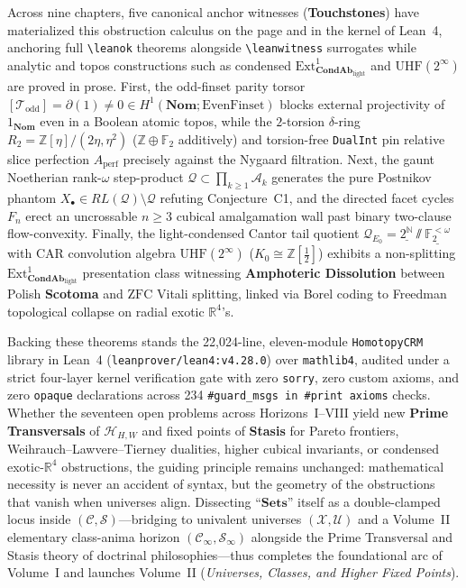 Across nine chapters, five canonical anchor witnesses (\textbf{Touchstones}) have materialized this obstruction calculus on the page and in the kernel of Lean~4, anchoring full \texttt{\textbackslash leanok} theorems alongside \texttt{\textbackslash leanwitness} surrogates while analytic and topos constructions such as condensed $\mathrm{Ext}^1_{\mathbf{CondAb}_{\mathrm{light}}}$ and $\mathrm{UHF}(2^\infty)$ are proved in prose. First, the odd-finset parity torsor $[\mathcal{T}_{\mathrm{odd}}] = \partial(1) \neq 0 \in H^1(\mathbf{Nom}; \mathrm{EvenFinset})$ blocks external projectivity of $1_{\mathbf{Nom}}$ even in a Boolean atomic topos, while the $2$-torsion $\delta$-ring $R_2 = \mathbb{Z}[\eta]/(2\eta, \eta^2)$ ($\mathbb{Z}\oplus\mathbb{F}_2$ additively) and torsion-free \texttt{DualInt} pin relative slice perfection $A_{\mathrm{perf}}$ precisely against the Nygaard filtration. Next, the gaunt Noetherian rank-$\omega$ step-product $\mathcal{Q} \subset \prod_{k \ge 1}\mathcal{A}_k$ generates the pure Postnikov phantom $X_\bullet \in RL(\mathcal{Q}) \setminus \mathcal{Q}$ refuting Conjecture~C1, and the directed facet cycles $F_n$ erect an uncrossable $n \ge 3$ cubical amalgamation wall past binary two-clause flow-convexity. Finally, the light-condensed Cantor tail quotient $\mathcal{Q}_{E_0} = \underline{2^{\mathbb{N}}} \sslash \underline{\mathbb{F}_2^{<\omega}}$ with CAR convolution algebra $\mathrm{UHF}(2^\infty)$ ($K_0 \cong \mathbb{Z}[\tfrac{1}{2}]$) exhibits a non-splitting $\mathrm{Ext}^1_{\mathbf{CondAb}_{\mathrm{light}}}$ presentation class witnessing \textbf{Amphoteric Dissolution} between Polish \textbf{Scotoma} and $\mathrm{ZFC}$ Vitali splitting, linked via Borel coding to Freedman topological collapse on radial exotic $\mathbb{R}^4$'s.

Backing these theorems stands the 22,024-line, eleven-module \texttt{HomotopyCRM} library in Lean~4 (\texttt{leanprover/lean4:v4.28.0}) over \texttt{mathlib4}, audited under a strict four-layer kernel verification gate with zero \texttt{sorry}, zero custom axioms, and zero \texttt{opaque} declarations across 234 \texttt{\#guard\_msgs in \#print axioms} checks. Whether the seventeen open problems across Horizons~I--VIII yield new \textbf{Prime Transversals} of $\mathcal{H}_{H,W}$ and fixed points of \textbf{Stasis} for Pareto frontiers, Weihrauch--Lawvere--Tierney dualities, higher cubical invariants, or condensed exotic-$\mathbb{R}^4$ obstructions, the guiding principle remains unchanged: mathematical necessity is never an accident of syntax, but the geometry of the obstructions that vanish when universes align. Dissecting ``$\mathbf{Sets}$'' itself as a double-clamped locus inside $(\mathcal{C}, \mathcal{S})$---bridging to univalent universes $(\mathcal{X}, \mathcal{U})$ and a Volume~II elementary class-anima horizon $(\mathcal{C}_\infty, \mathcal{S}_\infty)$ alongside the Prime Transversal and Stasis theory of doctrinal philosophies---thus completes the foundational arc of Volume~I and launches Volume~II (\emph{Universes, Classes, and Higher Fixed Points}).


